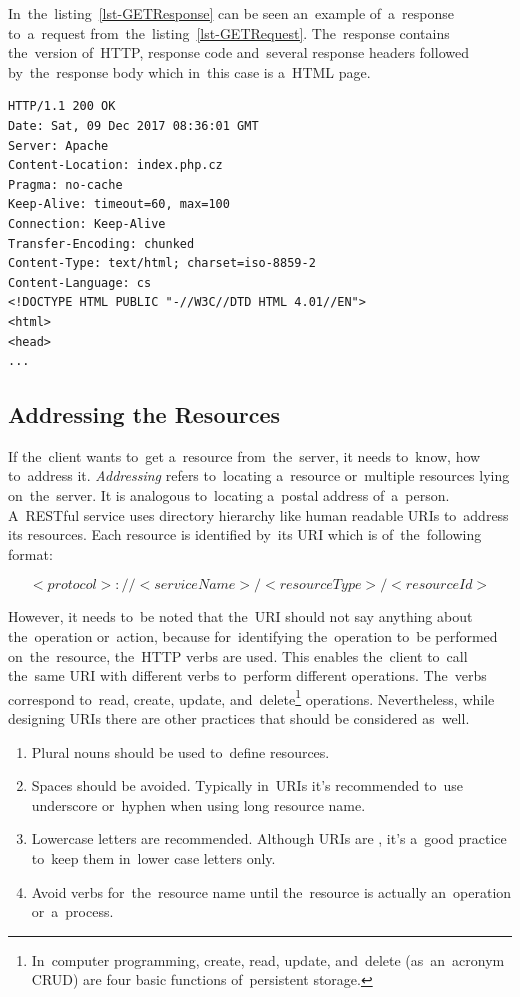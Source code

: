 In~the~listing~\ref{lst-GETResponse} can be seen an~example of~a~response
to~a~request from~the~listing~\ref{lst-GETRequest}. The~response contains
the~version of~HTTP, response code and~several response headers followed
by~the~response body which in~this case is a~HTML page.

\vspace{1mm}
\begin{lstlisting}[caption=An~example of~a~simplified response to~GET
request., label=lst-GETResponse, style=dp-html]
HTTP/1.1 200 OK
Date: Sat, 09 Dec 2017 08:36:01 GMT
Server: Apache
Content-Location: index.php.cz
Pragma: no-cache
Keep-Alive: timeout=60, max=100
Connection: Keep-Alive
Transfer-Encoding: chunked
Content-Type: text/html; charset=iso-8859-2
Content-Language: cs
<!DOCTYPE HTML PUBLIC "-//W3C//DTD HTML 4.01//EN">
<html>
<head>
...
\end{lstlisting}



\subsection{Addressing the Resources}
\label{sec-addressing}
If the~client wants to~get a~resource from~the~server, it needs to~know, how
to~address it. \textit{Addressing} refers to~locating a~resource or~multiple
resources lying on~the~server. It is analogous to~locating a~postal address
of~a~person. A~RESTful service uses directory hierarchy like human readable URIs
to~address its resources. Each resource is identified by~its URI which is
of~the~following format:

\begin{equation}
<protocol>://<serviceName>/<resourceType>/<resourceId>
\end{equation}

However, it needs to~be noted that the~URI should not say anything about
the~operation or~action, because for~identifying the~operation to~be performed
on~the~resource, the~HTTP verbs are used. This enables the~client to~call
the~same URI with different verbs to~perform different operations. The~verbs
correspond to~read, create, update, and~delete\footnote{In~computer
programming, create, read, update, and~delete (as~an~acronym CRUD) are four
basic functions of~persistent storage.} operations. Nevertheless, while
designing URIs there are other practices that should be considered as~well.

\begin{enumerate}
  \item Plural nouns should be used to~define resources.
  \item Spaces should be avoided. Typically in~URIs it's recommended to~use
  underscore or~hyphen when using long resource name.
  \item Lowercase letters are recommended. Although URIs are
  , it's a~good practice to~keep them in~lower case letters
  only.
  \item Avoid verbs for~the~resource name until the~resource is actually
  an~operation or~a~process.
\end{enumerate}



